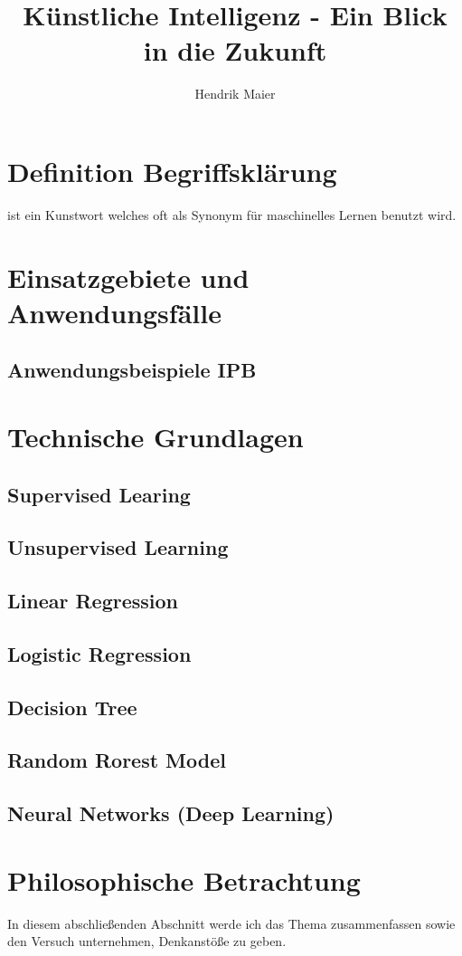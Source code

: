 \documentclass[12pt]{report}
\title{Künstliche Intelligenz - Ein Blick in die Zukunft}
\author{Hendrik Maier}
\date{}
\begin{document}
    \maketitle

    \tableofcontents
    \newpage

    \section{Definition Begriffsklärung}
     ist ein Kunstwort welches oft als Synonym für
    maschinelles Lernen benutzt wird.
    \section{Einsatzgebiete und Anwendungsfälle}
    \subsection{Anwendungsbeispiele IPB}
    \section{Technische Grundlagen}
    \subsection{Supervised Learing}
    \subsection{Unsupervised Learning}
    \subsection{Linear Regression}
    \subsection{Logistic Regression}
    \subsection{Decision Tree}
    \subsection{Random Rorest Model}
    \subsection{Neural Networks (Deep Learning)}
    \section{Philosophische Betrachtung}
    In diesem abschließenden Abschnitt werde ich das Thema zusammenfassen sowie den Versuch unternehmen,
    Denkanstöße zu geben.
\end{document}
